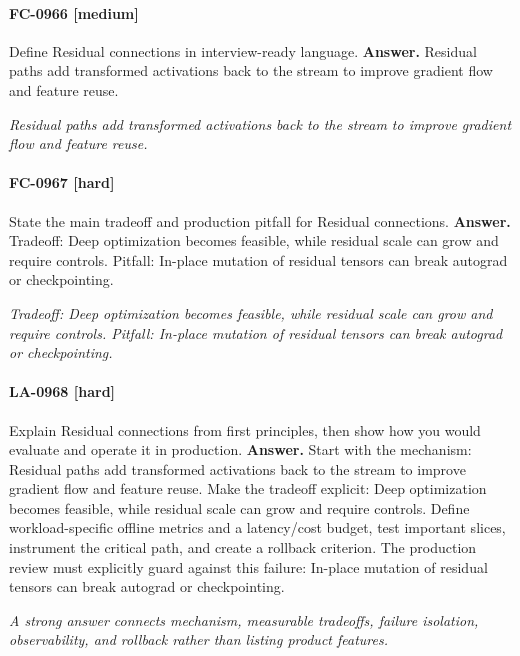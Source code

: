 \paragraph{FC-0966 [medium]} Define Residual connections in interview-ready language.
\noindent\textbf{Answer.} Residual paths add transformed activations back to the stream to improve gradient flow and feature reuse.
\par\textit{Residual paths add transformed activations back to the stream to improve gradient flow and feature reuse.}
\paragraph{FC-0967 [hard]} State the main tradeoff and production pitfall for Residual connections.
\noindent\textbf{Answer.} Tradeoff: Deep optimization becomes feasible, while residual scale can grow and require controls. Pitfall: In-place mutation of residual tensors can break autograd or checkpointing.
\par\textit{Tradeoff: Deep optimization becomes feasible, while residual scale can grow and require controls. Pitfall: In-place mutation of residual tensors can break autograd or checkpointing.}
\paragraph{LA-0968 [hard]} Explain Residual connections from first principles, then show how you would evaluate and operate it in production.
\noindent\textbf{Answer.} Start with the mechanism: Residual paths add transformed activations back to the stream to improve gradient flow and feature reuse. Make the tradeoff explicit: Deep optimization becomes feasible, while residual scale can grow and require controls. Define workload-specific offline metrics and a latency/cost budget, test important slices, instrument the critical path, and create a rollback criterion. The production review must explicitly guard against this failure: In-place mutation of residual tensors can break autograd or checkpointing.
\par\textit{A strong answer connects mechanism, measurable tradeoffs, failure isolation, observability, and rollback rather than listing product features.}
